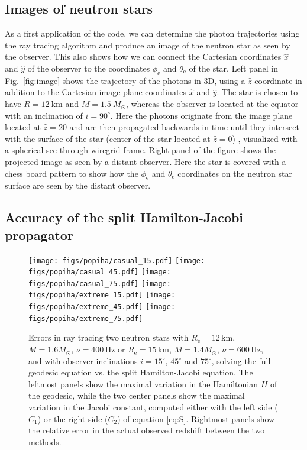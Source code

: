 \documentclass{aa}
\newcommand{\Msun}{\ensuremath{M_{\odot}}}
\begin{document}
\subsection{Images of neutron stars}

As a first application of the code, we can determine the photon trajectories using the ray tracing algorithm and produce an image of the neutron star as seen by the observer.
This also shows how we can connect the Cartesian coordinates $\hat{x}$ and $\hat{y}$ of the observer to the coordinates $\phi_{\mathrm{e}}$ and $\theta_{\mathrm{e}}$ of the star.
Left panel in Fig.~\ref{fig:image} shows the trajectory of the photons in 3D, using a $\hat{z}$-coordinate in addition to the Cartesian image plane coordinates $\hat{x}$ and $\hat{y}$.
The star is chosen to have $R=12~\mathrm{km}$ and $M=1.5~\Msun$, whereas the observer is located at the equator with an inclination of $i = 90^{\circ}$.
Here the photons originate from the image plane located at $\hat{z} = 20$ and are then propagated backwards in time until they intersect with the surface of the star (center of the star located at $\hat{z} = 0$) , visualized with a spherical see-through wiregrid frame.
Right panel of the figure shows the projected image as seen by a distant observer.
Here the star is covered with a chess board pattern to show how the $\phi_{\mathrm{e}}$ and $\theta_{\mathrm{e}}$ coordinates on the neutron star surface are seen by the distant observer.


\subsection{Accuracy of the split Hamilton-Jacobi propagator}

\begin{figure}[htbp!]
\centering
\texttt{[image: figs/popiha/casual\_15.pdf]}
\texttt{[image: figs/popiha/casual\_45.pdf]}
\texttt{[image: figs/popiha/casual\_75.pdf]}
\texttt{[image: figs/popiha/extreme\_15.pdf]}
\texttt{[image: figs/popiha/extreme\_45.pdf]}
\texttt{[image: figs/popiha/extreme\_75.pdf]}
\caption{\label{fig:H_C1_C2}
    Errors in ray tracing two neutron stars with $R_{\mathrm{e}}=12\,\mathrm{km}$, $M=1.6\Msun$, $\nu=400\,\mathrm{Hz}$ or $R_{\mathrm{e}}=15\,\mathrm{km}$, $M=1.4\Msun$, $\nu=600\,\mathrm{Hz}$, and with observer inclinations $i=15^\circ$, $45^\circ$ and $75^\circ$, solving the full geodesic equation vs. the split Hamilton-Jacobi equation.
    The leftmost panels show the maximal variation in the Hamiltonian $H$ of the geodesic, while the two center panels show the maximal variation in the Jacobi constant, computed either with the left side ($C_1$) or the right side ($C_2$) of equation \eqref{eq:S}.
    Rightmost panels show the relative error in the actual observed redshift between the two methods.
}
\end{figure}
\end{document}
